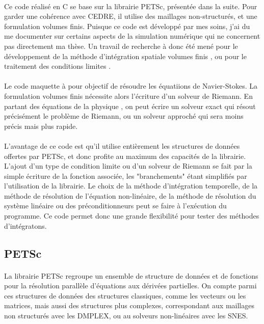     \paragraph{}
    Ce code réalisé en C se base sur la librairie PETSc, présentée dans la suite.
    Pour garder une cohérence avec CEDRE, il utilise des maillages non-structurés, et une formulation volumes finis.
    Puisque ce code est développé par mes soins, j'ai du me documenter sur certains aspects de la simulation numérique qui ne concernent pas directement ma thèse.
    Un travail de recherche à donc été mené pour le développement de la méthode d'intégration spatiale volumes finis \cite{EymardGallouetHerbin2000}, ou pour le traitement des conditions limites \cite{PoinsotLele1992}.

    \paragraph{}
    Le code maquette à pour objectif de résoudre les équatiions de Navier-Stokes.
    La formulation volumes finis nécessite alors l'écriture d'un solveur de Riemann.
    En partant des équations de la physique \cite{Masatsuka2013}, on peut écrire un solveur exact \cite{GottliebGroth1988} qui résout précisément le problème de Riemann, ou un solveur approché \cite{Roe1981} qui sera moins précis mais plus rapide.

    \paragraph{}
    L'avantage de ce code est qu'il utilise entièrement les structures de données offertes par PETSc, et donc profite au maximum des capacités de la librairie.
    L'ajout d'un type de condition limite ou d'un solveur de Riemann se fait par la simple écriture de la fonction associée, les "branchements" étant simplifiés par l'utilisation de la librairie.
    Le choix de la méthode d'intégration temporelle, de la méthode de résolution de l'équation non-linéaire, de la méthode de résolution du système linéaire ou des préconditionneurs peut se faire à l'exécution du programme.
    Ce code permet donc une grande flexibilité pour tester des méthodes d'intégratons.

  \subsection{PETSc}

    \paragraph{}
    La librairie PETSc \cite{petsc-web-page, petsc-user-ref, petsc-efficient} regroupe un ensemble de structure de données et de fonctions pour la résolution parallèle d'équations aux dérivées partielles.
    On compte parmi ces structures de données des structures classiques, comme les vecteurs ou les matrices, mais aussi des structures plus complexes, correspondant aux maillages non structurés avec les DMPLEX, ou au solveurs non-linéaires avec les SNES.

